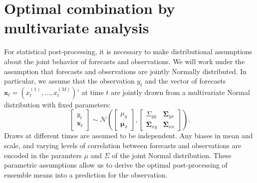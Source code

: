 \documentclass[12pt]{article}
\renewcommand{\vec}[1]{\bm{#1}}
\newcommand{\mat}[1]{\bm{#1}}
\begin{document}
\section{Optimal combination by multivariate analysis}

For statistical post-processing, it is necessary to make distributional assumptions about the joint behavior of forecasts and observations.
We will work under the assumption that forecasts and observations are jointly Normally distributed.
In particular, we assume that the observation $y_t$ and the vector of forecasts $\vec{x}_t = (x^{(1)}_t, \dots, x^{(M)}_t)'$ at time $t$ are jointly drawn from a multivariate Normal distribution with fixed parameters:
%
\begin{equation}
\left[\begin{matrix}y_t\\ \vec{x}_t\end{matrix} \right] \sim \mathcal{N}\left( \left[\begin{matrix}\mu_y \\ \vec{\mu}_x \end{matrix}\right], \left[ \begin{matrix}\Sigma_{yy} & \mat{\Sigma}_{yx} \\ \mat{\Sigma}_{xy} & \mat{\Sigma}_{xx} \end{matrix} \right]  \right).
\label{eq:jointdist}
\end{equation}
%
Draws at different times are assumed to be independent.
Any biases in mean and scale, and varying levels of correlation between forecasts and observations are encoded in the paramters $\mu$ and $\Sigma$ of the joint Normal distribution.
These parametric assumptions allow us to derive the optimal post-processing of ensemble means into a prediction for the observation.
\end{document}
